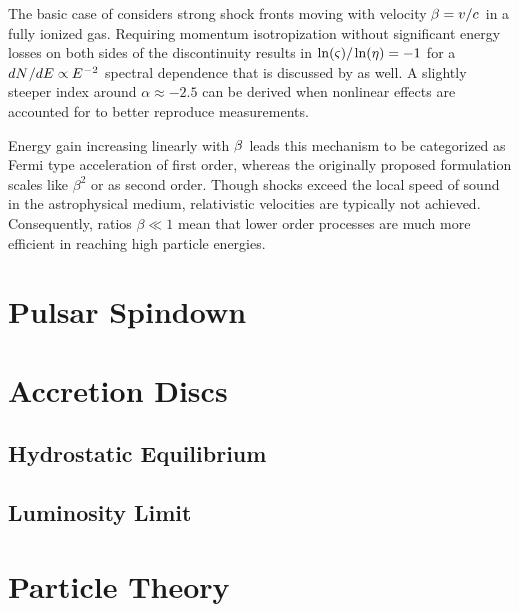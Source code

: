 The basic case of  considers strong shock fronts moving with velocity $\kern-0.5pt \beta = v / c \kern+1.0pt$ in a
fully ionized gas. Requiring momentum isotropization without significant energy losses on both sides of the discontinuity results
in $\ln(\varsigma) / \kern-0.5pt \ln(\eta) = -1$ for a $dN \kern+0.5pt / dE \propto \kern-0.5pt E^{\kern+0.5pt -2}$ spectral dependence
that is discussed by \cite{Longair_2011} as well. A slightly steeper index around $\alpha \approx \num{-2.5}$ can be derived when nonlinear
effects are accounted for to better reproduce measurements.

Energy gain increasing linearly with $\kern-0.5pt \beta \kern+1.0pt$ leads this mechanism to be categorized as Fermi type acceleration
of first order, whereas the originally proposed formulation scales like $\beta^2$ or as second order. Though shocks exceed the local
speed of sound in the astrophysical medium, relativistic velocities are typically not achieved. Consequently, ratios $\beta \ll 1$ mean
that lower order processes are much more efficient in reaching high particle energies.



\section{Pulsar Spindown}
\label{sec:spindown}



\section{Accretion Discs}
\label{sec:luminosity}

\cite{Longair_2011}

\subsection*{Hydrostatic Equilibrium}



\subsection*{Luminosity Limit}



\section{Particle Theory}
\label{sec:theory}



